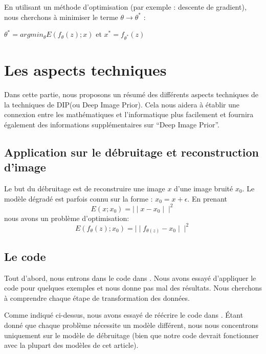 \documentclass[
  11pt,
  dvipsnames]{article}
\begin{document}
En utilisant un méthode d'optimisation (par exemple : descente de gradient), nous cherchons à minimiser le terme \(\theta \rightarrow \theta^*\) :

\begin {center} $\theta ^* = argmin_{\theta} E(f_{\theta}(z);x)$ et $x^* = f_{\theta^*}(z)$ \end {center}

\newpage

\hypertarget{les-aspects-techniques}{%
\section{Les aspects techniques}\label{les-aspects-techniques}}

Dans cette partie, nous proposons un résumé des différents aspects techniques de la techniques de DIP(ou Deep Image Prior).
Cela nous aidera à établir une connexion entre les mathématiques et l'informatique plus facilement
et fournira également des informations supplémentaires sur ``Deep Image Prior''.

\hypertarget{application-sur-le-duxe9bruitage-et-reconstruction-dimage}{%
\subsection{Application sur le débruitage et reconstruction d'image}\label{application-sur-le-duxe9bruitage-et-reconstruction-dimage}}

Le but du débruitage est de reconstruire une image \(x\) d'une image bruité \(x_0\). Le modèle dégradé est parfois connu sur la forme : \(x_0 = x + \epsilon\). En prenant \[ E(x;x_{0})= \mid\mid x - x_{0} \mid\mid^2 \] nous avons un problème d'optimisation: \[ E(f_{\theta}(z);x_{0})= \mid\mid f_{\theta(z)} - x_{0} \mid\mid^2 \]

\hypertarget{le-code}{%
\subsection{Le code}\label{le-code}}

Tout d'abord, nous entrons dans le code dans \autocite{1711.10925}. Nous avons essayé d'appliquer le code pour quelques exemples et nous donne pas mal des résultats. Nous cherchons à comprendre chaque étape de transformation des données.

Comme indiqué ci-dessus, nous avons essayé de réécrire le code dans \autocite{1711.10925}. Étant donné que chaque problème nécessite un modèle différent, nous nous concentrons uniquement sur le modèle de débruitage
(bien que notre code devrait fonctionner avec la plupart des modèles de cet article).
\end{document}

